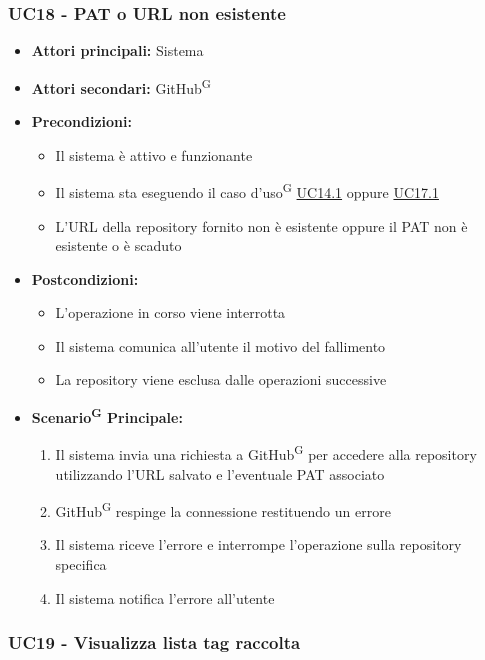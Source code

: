 \documentclass[a4paper, 11pt]{article}
\begin{document}
\subsubsection{UC18 - PAT o URL non esistente} \label{UC18}
\begin{itemize}
    \item \textbf{Attori principali:} Sistema
    \item \textbf{Attori secondari:} GitHub\textsuperscript{G}
    \item \textbf{Precondizioni:}
        \begin{itemize}
            \item Il sistema è attivo e funzionante
            \item Il sistema sta eseguendo il caso d'uso\textsuperscript{G} \hyperref[UC14.1]{UC14.1} oppure \hyperref[UC17.1]{UC17.1}
            \item L'URL della repository fornito non è esistente oppure il PAT non è esistente o è scaduto
        \end{itemize}
    \item \textbf{Postcondizioni:}
        \begin{itemize}
            \item L'operazione in corso viene interrotta
            \item Il sistema comunica all'utente il motivo del fallimento
            \item La repository viene esclusa dalle operazioni successive
        \end{itemize}
    \item \textbf{Scenario\textsuperscript{G} Principale:}
        \begin{enumerate}
            \item Il sistema invia una richiesta a GitHub\textsuperscript{G} per accedere alla repository utilizzando l'URL salvato e l'eventuale PAT associato
            \item GitHub\textsuperscript{G} respinge la connessione restituendo un errore 
            \item Il sistema riceve l'errore e interrompe l'operazione sulla repository specifica
            \item Il sistema notifica l'errore all'utente
        \end{enumerate}
\end{itemize}


\subsubsection{UC19 - Visualizza lista tag raccolta} \label{UC19}
\end{document}

